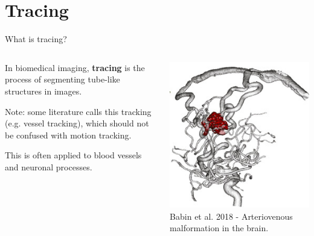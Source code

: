 \documentclass[9pt, aspectratio=169]{beamer}
\begin{document}
\section{Tracing}

\begin{frame}
    {What is tracing?}
    \begin{columns}
        \begin{column}{.7\textwidth}
            In biomedical imaging, \textbf{tracing} is the process of segmenting tube-like structures in images.
            \vspace{1em}

            Note: some literature calls this tracking (e.g. vessel tracking), which should not be confused with motion tracking.
            \vspace{1em}

            This is often applied to blood vessels and neuronal processes.
        \end{column}
        \begin{column}{.3\textwidth}
            \includegraphics[width=\textwidth]{Babin2018-aneurysm.png}
            \footnotesize
            Babin et al. 2018 - Arteriovenous malformation in the brain.
        \end{column}
    \end{columns}
\end{frame}
\end{document}
